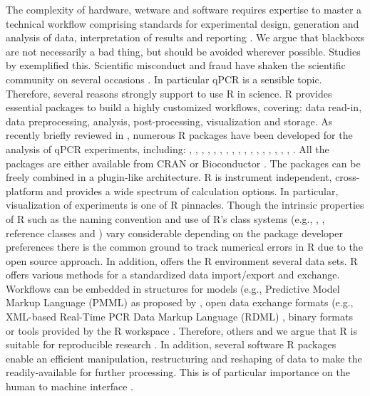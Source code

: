 The complexity of hardware, wetware and software requires expertise to master a 
technical workflow comprising standards for experimental design, generation and 
analysis of data, interpretation of results and reporting 
\citep{huggett_BDQ_2014}. We argue that blackboxs are not necessarily a bad 
thing, but should be avoided wherever possible. Studies by 
\citet{mccullough_2008, Almiron_2010, Duran_2014} exemplified this. Scientific 
misconduct and fraud have shaken the scientific community on several occasions 
\citep{fang_2012}. In particular qPCR is a sensible topic. Therefore, several 
reasons strongly support to use R in science. R provides essential packages to 
build a highly customized workflows, covering: data read-in, data preprocessing, 
analysis, post-processing, visualization and storage. As recently briefly 
reviewed in 
\citet{pabinger_2014}, numerous R packages have been developed for the analysis 
of qPCR experiments, including: , , 
, , , , 
, , , , 
, , , , 
, , , 
. All the packages are either available from CRAN or 
Bioconductor \citep{gentleman_2004}. The packages can be freely combined in a 
plugin-like architecture. R is instrument independent, cross-platform and 
provides a wide spectrum of calculation options. In particular, visualization of 
experiments is one of R pinnacles. Though the intrinsic properties of R such as 
the naming convention \citep{Baaaath_2012} and use of R's class systems (e.g., 
, , reference classes and ) vary considerable 
depending on the package developer preferences there is the common ground to 
track numerical errors in R due to the open source approach. In addition, offers 
the R environment several data sets. R offers various methods for a standardized 
data import/export and exchange. Workflows can be embedded in structures for 
models (e.g., Predictive Model Markup Language (PMML) as proposed by 
\citet{Guazzelli_2009}, open data exchange formats (e.g., XML-based Real-Time 
PCR Data Markup Language (RDML) \citep{lefever_2009}, binary formats 
\citep{michna_2013} or tools provided by the R workspace \citep{RDCT2010c}. 
Therefore, others and we argue that R is suitable for reproducible research 
\citep{Gesmann_2011, Murrell_2012, gandrud_2013, hofmann_2013, Leeper_2014, 
liu_2014}. In addition, several software R packages enable an efficient 
manipulation, restructuring and reshaping of data to make the readily-available 
for further processing. This is of particular importance on the human to machine 
interface \citep{Oh_2014}.

